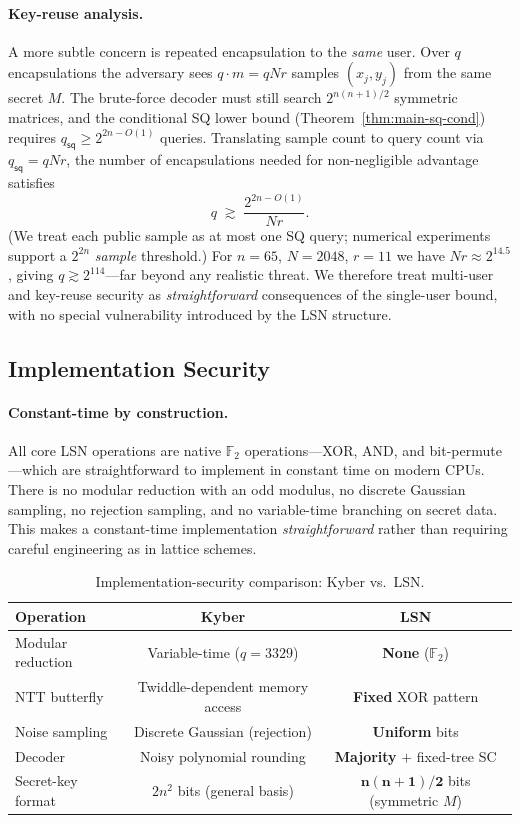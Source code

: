 \documentclass[11pt,a4paper]{article}
\theoremstyle{plain}
\theoremstyle{definition}
\newcommand{\F}{\mathbb{F}}
\begin{document}
\paragraph{Key-reuse analysis.}
A more subtle concern is repeated encapsulation to the \emph{same} user. Over $q$ encapsulations the adversary sees $q\cdot m=qNr$ samples $(x_j,y_j)$ from the same secret $M$. The brute-force decoder must still search $2^{n(n+1)/2}$ symmetric matrices, and the conditional SQ lower bound (Theorem~\ref{thm:main-sq-cond}) requires $q_{\mathsf{sq}}\geq 2^{2n-O(1)}$ queries. Translating sample count to query count via $q_{\mathsf{sq}}=qNr$, the number of encapsulations needed for non-negligible advantage satisfies
\[
q\;\gtrsim\;\frac{2^{2n-O(1)}}{Nr}.
\]
(We treat each public sample as at most one SQ query; numerical experiments support a $2^{2n}$ \emph{sample} threshold.) For $n=65$, $N=2048$, $r=11$ we have $Nr\approx 2^{14.5}$, giving $q\gtrsim 2^{114}$---far beyond any realistic threat. We therefore treat multi-user and key-reuse security as \emph{straightforward} consequences of the single-user bound, with no special vulnerability introduced by the LSN structure.

\subsection{Implementation Security}
\label{subsec:impl-sec}

\paragraph{Constant-time by construction.}
All core LSN operations are native $\F_2$ operations---XOR, AND, and bit-permute---which are straightforward to implement in constant time on modern CPUs. There is no modular reduction with an odd modulus, no discrete Gaussian sampling, no rejection sampling, and no variable-time branching on secret data. This makes a constant-time implementation \emph{straightforward} rather than requiring careful engineering as in lattice schemes.

\begin{table}[ht]
\centering
\caption{Implementation-security comparison: Kyber vs.~LSN.}
\begin{tabular}{@{}lcc@{}}
\hline
Operation & Kyber & LSN \\
\hline
Modular reduction & Variable-time ($q=3329$) & \textbf{None} ($\F_2$) \\
NTT butterfly & Twiddle-dependent memory access & \textbf{Fixed} XOR pattern \\
Noise sampling & Discrete Gaussian (rejection) & \textbf{Uniform} bits \\
Decoder & Noisy polynomial rounding & \textbf{Majority} $+$ fixed-tree SC \\
Secret-key format & $2n^2$ bits (general basis) & $\mathbf{n(n+1)/2}$ bits (symmetric $M$) \\
\hline
\end{tabular}
\end{table}
\end{document}
